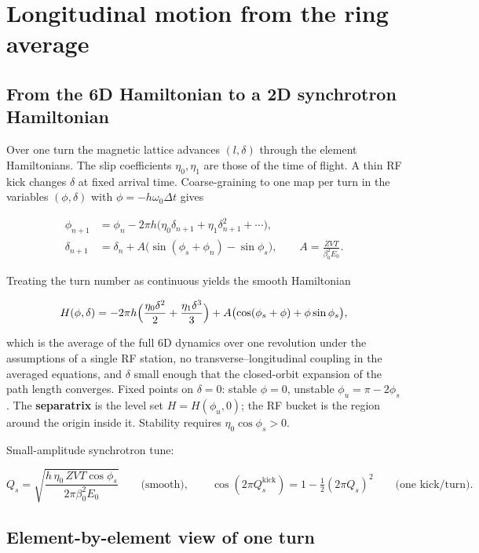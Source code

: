 \documentclass[11pt,a4paper]{article}
\begin{document}
\section{Longitudinal motion from the ring average}

\subsection{From the 6D Hamiltonian to a 2D synchrotron Hamiltonian}

Over one turn the magnetic lattice advances $(l,\delta)$ through the
element Hamiltonians. The slip coefficients $\eta_0,\eta_1$ are those of
the time of flight. A thin RF kick changes $\delta$ at fixed arrival time.
Coarse-graining to one map per turn in the variables
$(\phi,\delta)$ with $\phi=-h\omega_0\Delta t$ gives

\[
\begin{aligned}
\phi_{n+1}&=\phi_n-2\pi h\bigl(\eta_0\delta_{n+1}+\eta_1\delta_{n+1}^2+\cdots\bigr),\\
\delta_{n+1}&=\delta_n+A\bigl(\sin(\phi_s+\phi_n)-\sin\phi_s\bigr),\qquad
A=\frac{ZVT}{\beta_0^2 E_0}.
\end{aligned}
\]

Treating the turn number as continuous yields the smooth Hamiltonian

\[
H(\phi,\delta)=-2\pi h\Bigl(\frac{\eta_0\delta^2}{2}+\frac{\eta_1\delta^3}{3}\Bigr)
+A\bigl(\cos(\phi_s+\phi)+\phi\sin\phi_s\bigr),
\]

which is the average of the full 6D dynamics over one revolution under the
assumptions of a single RF station, no transverse–longitudinal coupling in the
averaged equations, and $\delta$ small enough that the closed-orbit expansion
of the path length converges. Fixed points on $\delta=0$: stable $\phi=0$,
unstable $\phi_u=\pi-2\phi_s$. The \textbf{separatrix} is the level set
$H=H(\phi_u,0)$; the RF bucket is the region around the origin inside it.
Stability requires $\eta_0\cos\phi_s>0$.

Small-amplitude synchrotron tune:

\[
Q_s=\sqrt{\frac{h\,\eta_0\,ZVT\cos\phi_s}{2\pi\beta_0^2 E_0}}
\qquad\text{(smooth)},\qquad
\cos(2\pi Q_s^{\mathrm{kick}})=1-\tfrac12(2\pi Q_s)^2
\qquad\text{(one kick/turn)}.
\]

\subsection{Element-by-element view of one turn}
\end{document}
